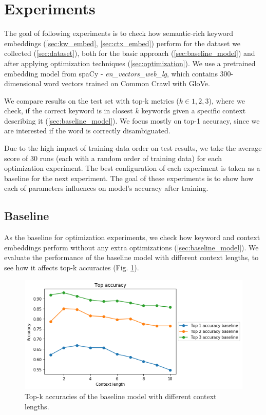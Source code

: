 \documentclass{llncs}
\begin{document}
\section{Experiments}
\label{sec:experiments}
The goal of following experiments is to check how semantic-rich keyword embeddings (\ref{sec:kw_embed}, \ref{sec:ctx_embed}) perform for the dataset we collected (\ref{sec:dataset}), both for the basic approach (\ref{sec:baseline_model}) and after applying optimization techniques (\ref{sec:optimization}).
We use a pretrained embedding model from spaCy - \textit{en\_vectors\_web\_lg}, which contains 300-dimensional word vectors trained on Common Crawl with GloVe\cite{spacymodel}.

We compare results on the test set with top-k metrics (\(k \in {1, 2, 3}\)), where we check, if the correct keyword is in closest \(k\) keywords given a specific context describing it (\ref{sec:baseline_model}). We focus mostly on top-1 accuracy, since we are interested if the word is correctly disambiguated.

Due to the high impact of training data order on test results, we take the average score of 30 runs (each with a random order of training data) for each optimization experiment.
The best configuration of each experiment is taken as a baseline for the next experiment.
The goal of these experiments is to show how each of parameters influences on model's accuracy after training.

\subsection{Baseline}
\label{sec:exp_baseline}
As the baseline for optimization experiments, we check how keyword and context embeddings perform without any extra optimizations (\ref{sec:baseline_model}).
We evaluate the performance of the baseline model with different context lengths, to see how it affects top-k accuracies (Fig. \ref{fig:baseline}).

\begin{figure}
    \centering
    \caption{Top-k accuracies of the baseline model with different context lengths.}
    \label{fig:baseline}
    \includegraphics[scale=0.5]{res/baseline_context_top_acc.png}
\end{figure}
\end{document}
